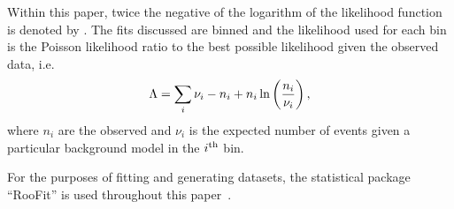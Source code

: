 Within this paper, twice the negative of the logarithm of the likelihood
function is denoted by \nll. The fits discussed are binned and the 
likelihood used for each bin is the Poisson likelihood ratio to the best
possible likelihood given the observed data, i.e.
\begin{equation}
\nll = \sum_{i} \nu_i - n_i + n_i \ln\left(\frac{n_i}{\nu_i}\right),
\label{eqn:introduction:def2NLL}
\end{equation}
where $n_{i}$ are the observed and $\nu_{i}$ is the expected number of events 
given a particular background model in the $i^{\rm th}$ bin. 

For the purposes of fitting and generating datasets, the statistical package 
``RooFit'' is used throughout this paper~\cite{ref:roofit}. 

